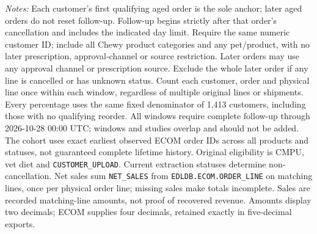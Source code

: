 \begin{table}[!htbp]
\begin{minipage}{\linewidth}
\footnotesize
\textit{Notes:} Each customer's first qualifying aged order is the sole anchor;
later aged orders do not reset follow-up. Follow-up begins strictly after that
order's cancellation and includes the indicated day limit. Require the same numeric customer ID; include all Chewy product categories and any pet/product, with no later prescription, approval-channel or source restriction. Later orders may use any approval channel or prescription
source. Exclude the whole later order if any line is cancelled or has unknown
status. Count each customer, order and physical line once within each window,
regardless of multiple original lines or shipments. Every percentage uses the
same fixed denominator of 1,413 customers, including those with no
qualifying reorder. All windows require complete follow-up through
2026-10-28 00:00 UTC; windows and studies overlap and should not be added.
The cohort uses exact earliest observed ECOM order IDs across all products and statuses, not guaranteed complete lifetime history. Original eligibility is CMPU,
vet diet and \texttt{CUSTOMER\_UPLOAD}. Current extraction statuses determine
non-cancellation. Net sales sum \texttt{NET\_SALES} from \texttt{EDLDB.ECOM.ORDER\_LINE} on matching
lines, once per physical order line; missing sales make totals incomplete.
Sales are recorded matching-line amounts, not proof of recovered revenue.
Amounts display two decimals; ECOM supplies four decimals, retained exactly in five-decimal exports.
\end{minipage}
\end{table}

